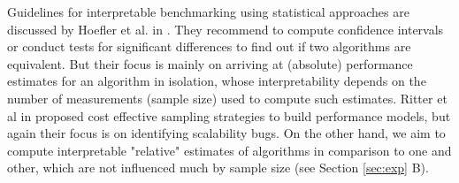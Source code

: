 \documentclass[conference]{IEEEtran}
\begin{document}
Guidelines for interpretable benchmarking using statistical approaches are discussed by Hoefler et al. in \cite{hoefler2015scientific}. They recommend to compute confidence intervals or conduct tests for significant differences to find out if two
algorithms are equivalent. But their focus is mainly on arriving at (absolute) performance estimates for an algorithm in isolation, whose interpretability depends on the number of measurements (sample size) used to compute such estimates. Ritter et al in \cite{ritter2020learning} proposed cost effective sampling strategies to build performance models, but again their focus is on identifying scalability bugs. On the other hand, we aim to compute interpretable "relative" estimates of algorithms in comparison to one and other, which are not influenced much by sample size (see Section \ref{sec:exp} B).
 
\end{document}
